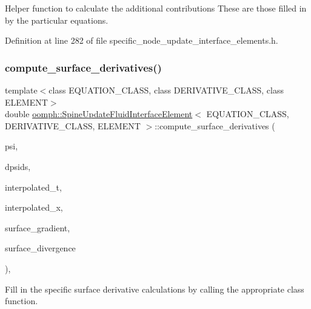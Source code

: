 Helper function to calculate the additional contributions These are those filled in by the particular equations. 



Definition at line 282 of file specific\+\_\+node\+\_\+update\+\_\+interface\+\_\+elements.\+h.

\mbox{\label{classoomph_1_1SpineUpdateFluidInterfaceElement_a75debcd348674d5ea58bfefc0e72b737}} 
\subsubsection{\texorpdfstring{compute\+\_\+surface\+\_\+derivatives()}{compute\_surface\_derivatives()}}
{\footnotesize\ttfamily template$<$class E\+Q\+U\+A\+T\+I\+O\+N\+\_\+\+C\+L\+A\+SS, class D\+E\+R\+I\+V\+A\+T\+I\+V\+E\+\_\+\+C\+L\+A\+SS, class E\+L\+E\+M\+E\+NT$>$ \\
double \hyperlink{classoomph_1_1SpineUpdateFluidInterfaceElement}{oomph\+::\+Spine\+Update\+Fluid\+Interface\+Element}$<$ E\+Q\+U\+A\+T\+I\+O\+N\+\_\+\+C\+L\+A\+SS, D\+E\+R\+I\+V\+A\+T\+I\+V\+E\+\_\+\+C\+L\+A\+SS, E\+L\+E\+M\+E\+NT $>$\+::compute\+\_\+surface\+\_\+derivatives (\begin{DoxyParamCaption}\item[{const Shape \&}]{psi,  }\item[{const D\+Shape \&}]{dpsids,  }\item[{const Dense\+Matrix$<$ double $>$ \&}]{interpolated\+\_\+t,  }\item[{const Vector$<$ double $>$ \&}]{interpolated\+\_\+x,  }\item[{D\+Shape \&}]{surface\+\_\+gradient,  }\item[{D\+Shape \&}]{surface\+\_\+divergence }\end{DoxyParamCaption})\hspace{0.3cm}{\ttfamily [inline]}, {\ttfamily [protected]}}



Fill in the specific surface derivative calculations by calling the appropriate class function. 



